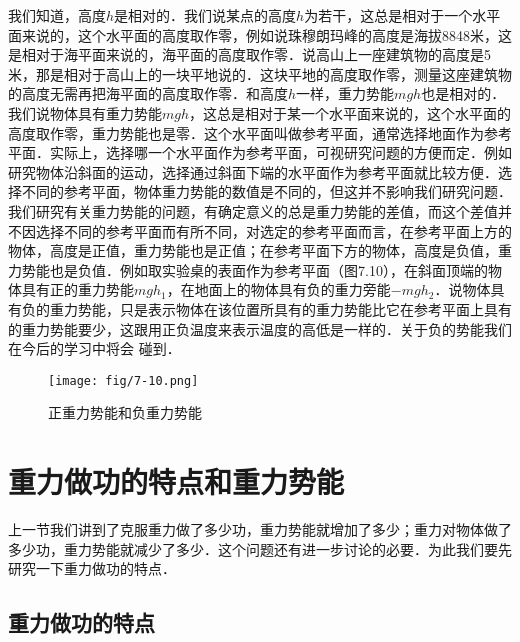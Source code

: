 我们知道，高度$h$是相对的．我们说某点的高度$h$为若干，这总是相对于一个水平面来说的，这个水平面的高度取作零，例如说珠穆朗玛峰的高度是海拔8848米，这是相对于海平面来说的，海平面的高度取作零．说高山上一座建筑物的高度是5米，那是相对于高山上的一块平地说的．这块平地的高度取作零，测量这座建筑物的高度无需再把海平面的高度取作零．和高度$h$一样，重力势能$mgh$也是相对的．我们说物体具有重力势能$mgh$，这总是相对于某一个水平面来说的，这个水平面的高度取作零，重力势能也是零．这个水平面叫做参考平面，通常选择地面作为参考平面．实际上，选择哪一个水平面作为参考平面，可视研究问题的方便而定．例如研究物体沿斜面的运动，选择通过斜面下端的水平面作为参考平面就比较方便．选择不同的参考平面，物体重力势能的数值是不同的，但这并不影响我们研究问题．我们研究有关重力势能的问题，有确定意义的总是重力势能的差值，而这个差值并不因选择不同的参考平面而有所不同，对选定的参考平面而言，在参考平面上方的物体，高度是正值，重力势能也是正值；在参考平面下方的物体，高度是负值，重力势能也是负值．例如取实验桌的表面作为参考平面（图7.10），在斜面顶端的物体具有正的重力势能$mgh_1$，在地面上的物体具有负的重力旁能$-mgh_2$．说物体具有负的重力势能，只是表示物体在该位置所具有的重力势能比它在参考平面上具有的重力势能要少，这跟用正负温度来表示温度的高低是一样的．关于负的势能我们在今后的学习中将会
碰到．
\begin{figure}[htp]
\centering\texttt{[image: fig/7-10.png]}
\caption{正重力势能和负重力势能}
\end{figure}

\section{重力做功的特点和重力势能}
上一节我们讲到了克服重力做了多少功，重力势能就增加了多少；重力对物体做了多少功，重力势能就减少了多少．这个问题还有进一步讨论的必要．为此我们要先研究一下重力做功的特点．

\subsection{重力做功的特点}
\begin{figure}[htp]\centering
{}
\caption{}
\end{figure}


